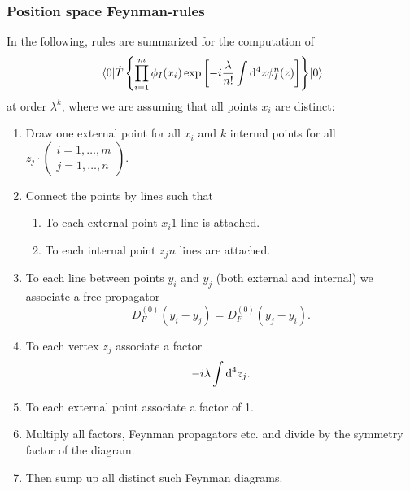 \subsubsection{Position space Feynman-rules}
In the following, rules are summarized for the computation of
\begin{equation}
	\expval{\hat{T} \left\{ \prod_{i=1}^{m} \phi_I(x_i) \exp\left[-i  \frac{\lambda}{n!} \int \mathrm{d}^4 z \phi^n_I(z) \right] 	\right\}}{0}
\end{equation}
at order $\lambda^k$, where we are assuming that all points $x_i$ are distinct:
\begin{enumerate}
	\item Draw one external point for all $x_i$ and $k$ internal points for all $z_j \cdot \left( \begin{array}{lr}
	i=1,\dots,m \\
	j=1,\dots,n
	\end{array}\right).$
	\item Connect the points by lines such that 
	\begin{enumerate}
		\item To each external point $x_i 1$ line is attached.
		\item To each internal point $z_j n$ lines are attached.
	\end{enumerate}
\item To each line between points $y_i$ and $y_j$ (both external and internal) we associate a free propagator
\begin{equation}
D^{(0)}_F(y_i - y_j) = D^{(0)}_F(y_j-y_i).
\end{equation}
\item To each vertex $z_j$ associate a factor
\begin{equation}
	-i \lambda \int \mathrm{d}^4z_j.
\end{equation}
\item To each external point associate a factor of 1.
\item Multiply all factors, Feynman propagators etc. and divide by the symmetry factor of the diagram.
\item Then sump up all distinct such Feynman diagrams.
\end{enumerate}


